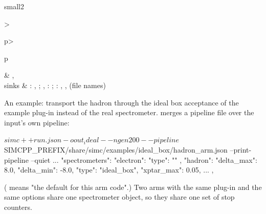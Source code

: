 \begin{simctable}{small}{2}{>{\raggedright\arraybackslash}p{\tabcolsep\relax}>{\raggedright\arraybackslash}p{\tabcolsep\relax}}
 & ,  \\
sinks & : , ; , : ; : , ,  (file names) \\
\end{simctable}
An example: transport the hadron through the ideal box acceptance of the example plug-in instead of the real
spectrometer.  merges a pipeline file over the input's own pipeline:

\begin{simcshell}[basicstyle=\ttfamily\tiny]
$ simc++ run.json -o out_ideal --ngen 200 --pipeline $SIMCPP_PREFIX/share/simc/examples/ideal_box/hadron_arm.json --print-pipeline --quiet
  ...
  "spectrometers": {
    "electron": { "type": "" },
    "hadron": { "delta_max": 8.0, "delta_min": -8.0, "type": "ideal_box", "xptar_max": 0.05, ... }
  },
\end{simcshell}
( means "the default for this arm code".) Two arms with the same plug-in and the same options share one
spectrometer object, so they share one set of stop counters.

